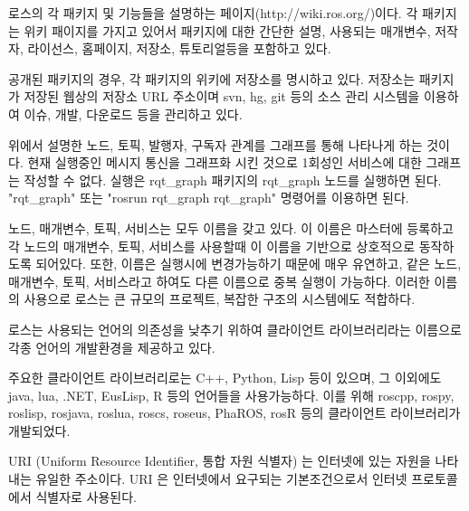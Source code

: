 \begin{definition}
로스의 각 패키지 및 기능들을 설명하는 페이지(http://wiki.ros.org/)이다.  각 패키지는 위키 패이지를 가지고 있어서 패키지에 대한 간단한 설명, 사용되는 매개변수, 저작자, 라이선스, 홈페이지, 저장소, 튜토리얼등을 포함하고 있다.
\end{definition}

\begin{definition}
공개된 패키지의 경우, 각 패키지의 위키에 저장소를 명시하고 있다. 저장소는 패키지가 저장된 웹상의 저장소 URL 주소이며 svn, hg, git 등의 소스 관리 시스템을 이용하여 이슈, 개발, 다운로드 등을 관리하고 있다.
\end{definition}

\begin{definition}
위에서 설명한 노드, 토픽, 발행자, 구독자 관계를 그래프를 통해 나타나게 하는 것이다. 현재 실행중인 메시지 통신을 그래프화 시킨 것으로 1회성인 서비스에 대한 그래프는 작성할 수 없다. 실행은 rqt\_graph 패키지의 rqt\_graph 노드를 실행하면 된다. "rqt\_graph" 또는 "rosrun rqt\_graph rqt\_graph" 명령어를 이용하면 된다.   
\end{definition}

\begin{definition}[이름(name)]
노드, 매개변수, 토픽, 서비스는 모두 이름을 갖고 있다. 이 이름은 마스터에 등록하고 각 노드의 매개변수, 토픽, 서비스를 사용할때 이 이름을 기반으로 상호적으로 동작하도록 되어있다. 또한, 이름은 실행시에 변경가능하기 때문에 매우 유연하고, 같은 노드, 매개변수, 토픽, 서비스라고 하여도 다른 이름으로 중복 실행이 가능하다. 이러한 이름의 사용으로 로스는 큰 규모의 프로젝트, 복잡한 구조의 시스템에도 적합하다.  
\end{definition}

\begin{definition}
로스는 사용되는 언어의 의존성을 낮추기 위하여 클라이언트 라이브러리라는 이름으로 각종 언어의 개발환경을 제공하고 있다. 

주요한 클라이언트 라이브러리로는 C++, Python, Lisp 등이 있으며, 그 이외에도 java, lua, .NET, EusLisp, R 등의 언어들을 사용가능하다. 이를 위해 roscpp, rospy, roslisp, rosjava, roslua, roscs, roseus, PhaROS, rosR 등의 클라이언트 라이브러리가 개발되었다.
\end{definition}

\begin{definition}
URI (Uniform Resource Identifier, 통합 자원 식별자) 는 인터넷에 있는 자원을 나타내는 유일한 주소이다. URI 은 인터넷에서 요구되는 기본조건으로서 인터넷 프로토콜에서 식별자로 사용된다.
\end{definition}


